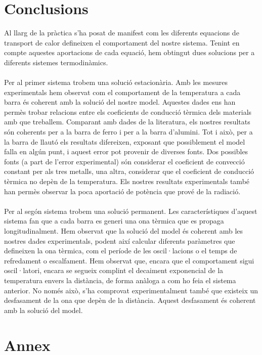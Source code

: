 \documentclass[12pt,twosides,onecolumn,openany]{article}
\begin{document}
\begin{multicols}{2}
\section{Conclusions}
Al llarg de la pràctica s'ha posat de manifest com les diferents equacions de transport de calor defineixen el comportament del nostre sistema. Tenint en compte aquestes aportacions de cada equació, hem obtingut dues solucions per a diferents sistemes termodinàmics.\\\\
Per al primer sistema trobem una solució estacionària. Amb les mesures experimentals hem observat com el comportament de la temperatura a cada barra és coherent amb la solució del nostre model. Aquestes dades ens han permès trobar relacions entre els coeficients de conducció tèrmica dels materials amb que treballem. Comparant amb dades de la literatura, els nostres resultats són coherents per a la barra de ferro i per a la barra d'alumini. Tot i això, per a la barra de llautó els resultats difereixen, exposant que possiblement el model falla en algún punt, i aquest error pot provenir de diverses fonts. Dos possibles fonts (a part de l'error experimental) són considerar el coeficient de convecció constant per als tres metalls, una altra, considerar que el coeficient de conducció tèrmica no depèn de la temperatura. Els nostres resultats experimentals també han permès observar la poca aportació de potència que prové de la radiació.\\\\
Per al segón sistema trobem una solució permanent. Les característiques d'aquest sistema fan que a cada barra es generi una ona tèrmica que es propaga longitudinalment. Hem observat que la solució del model és coherent amb les nostres dades experimentals, podent així calcular diferents paràmetres que defineixen la ona tèrmica, com el període de les oscil·lacions o el temps de refredament o escalfament. Hem observat que, encara que el comportament sigui oscil·latori, encara se segueix complint el decaiment exponencial de la temperatura envers la distància, de forma anàloga a com ho feia el sistema anterior. No només això, s'ha comprovat experimentalment també que existeix un desfasament de la ona que depèn de la distància. Aquest desfasament és coherent amb la solució del model.
\section{Annex}

\end{multicols}
\end{document}
